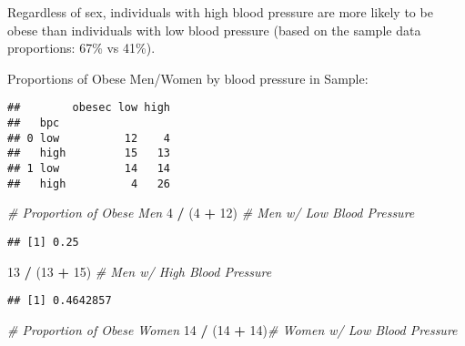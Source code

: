 \documentclass[]{article}
\newenvironment{Shaded}{\begin{snugshade}}{\end{snugshade}}
\newcommand{\KeywordTok}[1]{\textcolor[rgb]{0.13,0.29,0.53}{\textbf{#1}}}
\newcommand{\DecValTok}[1]{\textcolor[rgb]{0.00,0.00,0.81}{#1}}
\newcommand{\StringTok}[1]{\textcolor[rgb]{0.31,0.60,0.02}{#1}}
\newcommand{\CommentTok}[1]{\textcolor[rgb]{0.56,0.35,0.01}{\textit{#1}}}
\newcommand{\OperatorTok}[1]{\textcolor[rgb]{0.81,0.36,0.00}{\textbf{#1}}}
\newcommand{\NormalTok}[1]{#1}
\begin{document}
Regardless of sex, individuals with high blood pressure are more likely
to be obese than individuals with low blood pressure (based on the
sample data proportions: 67\% vs 41\%).

Proportions of Obese Men/Women by blood pressure in Sample:

\begin{Shaded}
\end{Shaded}

\begin{verbatim}
##        obesec low high
##   bpc                 
## 0 low          12    4
##   high         15   13
## 1 low          14   14
##   high          4   26
\end{verbatim}

\begin{Shaded}
\begin{Highlighting}[]
\CommentTok{# Proportion of Obese Men}
\DecValTok{4} \OperatorTok{/}\StringTok{ }\NormalTok{(}\DecValTok{4} \OperatorTok{+}\StringTok{ }\DecValTok{12}\NormalTok{)   }\CommentTok{# Men w/ Low Blood Pressure}
\end{Highlighting}
\end{Shaded}

\begin{verbatim}
## [1] 0.25
\end{verbatim}

\begin{Shaded}
\begin{Highlighting}[]
\DecValTok{13} \OperatorTok{/}\StringTok{ }\NormalTok{(}\DecValTok{13} \OperatorTok{+}\StringTok{ }\DecValTok{15}\NormalTok{) }\CommentTok{# Men w/ High Blood Pressure}
\end{Highlighting}
\end{Shaded}

\begin{verbatim}
## [1] 0.4642857
\end{verbatim}

\begin{Shaded}
\begin{Highlighting}[]
\CommentTok{# Proportion of Obese Women}
\DecValTok{14} \OperatorTok{/}\StringTok{ }\NormalTok{(}\DecValTok{14} \OperatorTok{+}\StringTok{ }\DecValTok{14}\NormalTok{)}\CommentTok{# Women w/ Low Blood Pressure}
\end{Highlighting}
\end{Shaded}
\end{document}

